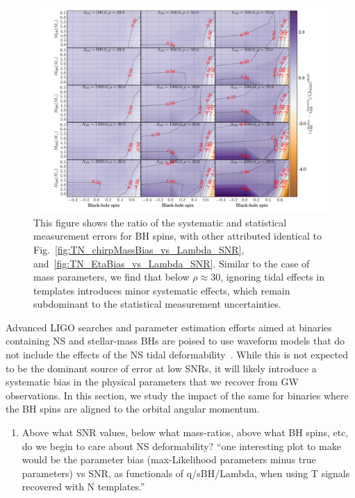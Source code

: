 \documentclass[aps,prd,amsmath,floats,floatfix, twocolumn,
superscriptaddress,nofootinbib,showpacs]{revtex4-1}
\begin{document}
\begin{figure}
\centering
\includegraphics[trim={1.3cm 0 0 0},width=2.\columnwidth]{plots/TNChiBHBiasesOverCIWidths_CI90_0_Lambda_SNR_linear}
\caption{This figure shows the ratio of the systematic and statistical
measurement errors for BH spins, with other attributed identical to 
Fig.~\ref{fig:TN_chirpMassBias_vs_Lambda_SNR}, and~\ref{fig:TN_EtaBias_vs_Lambda_SNR}.
Similar to the case of mass parameters, we find that below
$\rho\approx 30$, ignoring tidal effects in templates introduces minor systematic effects,
which remain subdominant to the statistical measurement uncertainties.
}
\label{fig:TNT_BHspinBias_vs_SNR_q23}
\end{figure}
% 
% 
Advanced LIGO searches and parameter estimation efforts aimed at binaries 
containing NS and stellar-mass BHs are poised to use waveform models that do not
include the effects of the NS tidal deformability~\cite{Canton:2014ena}.
While this is not expected to
be the dominant source of error at low SNRs, it will likely introduce a
systematic bias in the physical parameters that we recover from GW observations.
In this section, we study the impact of the same for binaries where the BH spins
are aligned to the orbital angular momentum.

\begin{enumerate}
\item Above what SNR values, below what mass-ratios, above what BH spins, etc, 
do we begin to care about NS deformability?\newline
``one interesting plot to make would be the parameter bias (max-Likelihood
parameters minus true parameters) vs SNR, as functionals of q/sBH/Lambda, when
using T signals recovered with N templates.''\newline
\end{enumerate}
\end{document}
